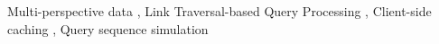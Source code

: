\documentclass[a4paper,fleqn]{cas-dc}
\begin{document}
\begin{keywords}
    Multi-perspective data \sep
    Link Traversal-based Query Processing \sep
    Client-side caching \sep
    Query sequence simulation
\end{keywords}

\maketitle









\FloatBarrier
\printcredits

%




\FloatBarrier


\end{document}
